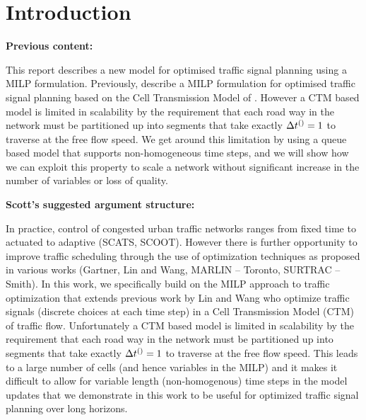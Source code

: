 \section{Introduction}

{\bf Previous content:}

This report describes a new model for optimised traffic signal
planning using a MILP formulation. Previously,
 describe a MILP formulation for optimised
traffic signal planning based on the Cell Transmission Model of
. However a CTM based model is limited in
scalability by the requirement that each road way in the network must
be partitioned up into segments that take exactly $\DT[]=1$ to
traverse at the free flow speed. We get around this limitation by
using a queue based model that supports non-homogeneous time steps,
and we will show how we can exploit this property to scale a network
without significant increase in the number of variables or loss of
quality.

{\bf Scott's suggested argument structure:}


In practice, control of congested urban traffic networks ranges from
fixed time to actuated to adaptive (SCATS, SCOOT).  However there is
further opportunity to improve traffic scheduling through the use of
optimization techniques as proposed in various works
(Gartner, Lin and Wang, MARLIN -- Toronto, SURTRAC -- Smith).  In this
work, we specifically build on the MILP approach to traffic
optimization that extends previous work by Lin and Wang who
optimize traffic signals (discrete choices at each time step) in a 
Cell Transmission Model (CTM)~ of traffic flow.
Unfortunately a CTM based model is limited in
scalability by the requirement that each road way in the network must
be partitioned up into segments that take exactly $\DT[]=1$ to
traverse at the free flow speed.
This leads to a large number of cells
(and hence variables in the MILP) and it makes it difficult to
allow for variable length (non-homogenous) time steps in the model
updates that we demonstrate in this work
to be useful for optimized traffic signal planning over long horizons.

